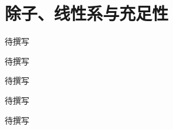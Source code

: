 
% 
% 

\chapter{除子、线性系与充足性}
\label{g5:ch:17}

\begin{chapterabstract}
待撰写
\end{chapterabstract}

\begin{learninggoals}
待撰写
\end{learninggoals}

待撰写






\begin{chaptersummary}
待撰写
\end{chaptersummary}

\BookExercises
待撰写
